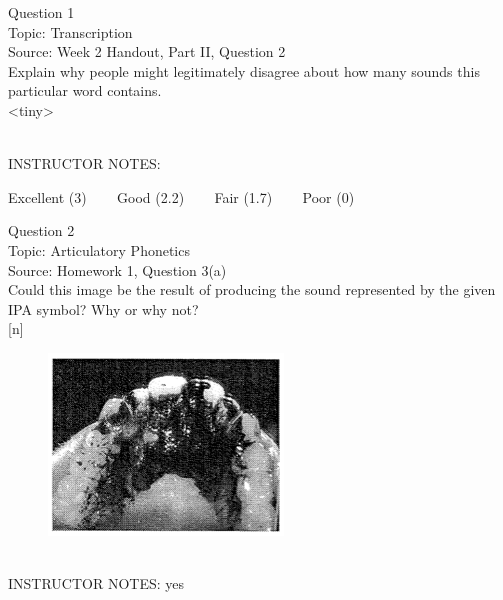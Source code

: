 \documentclass[12pt]{article}
\begin{document}
\begin{center}
\textbf{{\color{blue}{\HUGE START OF EXAM\\}}}

\textbf{{\color{blue}{\HUGE Student ID: 74431\\}}}

\textbf{{\color{blue}{\HUGE \\}}}

\end{center}
\newpage

{\large Question 1}\\

Topic: Transcription\\
Source: Week 2 Handout, Part II, Question 2\\

Explain why people might legitimately disagree about how many sounds this particular word contains.\\

<tiny>


~\\
INSTRUCTOR NOTES: 


\vfill
Excellent (3) ~~~ Good (2.2) ~~~ Fair (1.7) ~~~ Poor (0)
\newpage

{\large Question 2}\\

Topic: Articulatory Phonetics\\
Source: Homework 1, Question 3(a)\\

Could this image be the result of producing the sound represented by the given IPA symbol? Why or why not?\\

{[n]}

\begin{figure}[H]
\includegraphics{../images/staticpalatography_stop.png}
\end{figure}

~\\
INSTRUCTOR NOTES: yes
\end{document}
